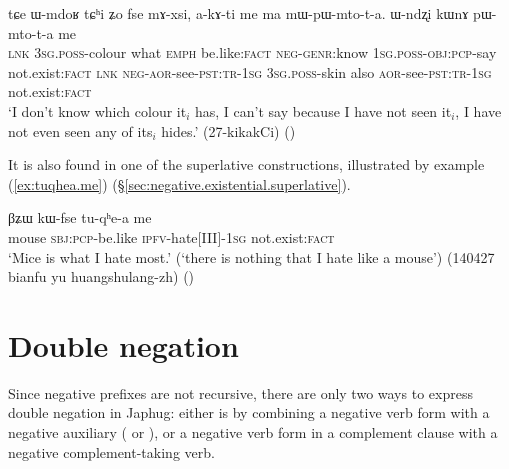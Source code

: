 \begin{exe}
	\ex \label{ex:pWmtota.me2}
	\gll  tɕe ɯ-mdoʁ tɕʰi ʑo fse mɤ-xsi, a-kɤ-ti me ma mɯ-pɯ-mto-t-a. ɯ-ndʐi kɯnɤ pɯ-mto-t-a me \\
	\textsc{lnk} \textsc{3sg}.\textsc{poss}-colour what \textsc{emph} be.like:\textsc{fact} \textsc{neg}-\textsc{genr}:know \textsc{1sg}.\textsc{poss}-\textsc{obj}:\textsc{pcp}-say not.exist:\textsc{fact} \textsc{lnk} \textsc{neg}-\textsc{aor}-see-\textsc{pst}:\textsc{tr}-\textsc{1sg} \textsc{3sg}.\textsc{poss}-skin also \textsc{aor}-see-\textsc{pst}:\textsc{tr}-\textsc{1sg} not.exist:\textsc{fact} \\
	\glt `I don't know which colour it$_i$ has, I can't say because I have not seen it$_i$, I have not even seen any of its$_i$ hides.' (27-kikakCi)
()
\end{exe}

It is also found in one of the superlative constructions, illustrated by example (\ref{ex:tuqhea.me}) (§\ref{sec:negative.existential.superlative}).

\begin{exe}
	\ex \label{ex:tuqhea.me}
	\gll βʑɯ kɯ-fse tu-qʰe-a me \\
	mouse \textsc{sbj}:\textsc{pcp}-be.like \textsc{ipfv}-hate[III]-\textsc{1sg} not.exist:\textsc{fact} \\
	\glt `Mice is what I hate most.' (`there is nothing that I hate like a mouse') (140427 bianfu yu huangshulang-zh) ()
\end{exe}


\section{Double negation} \label{sec:double.negation}
Since negative prefixes are not recursive, there are only two ways to express double negation in Japhug: either is by combining a negative verb form with a negative auxiliary ( or ), or a negative verb form in a complement clause with a negative complement-taking verb. 

